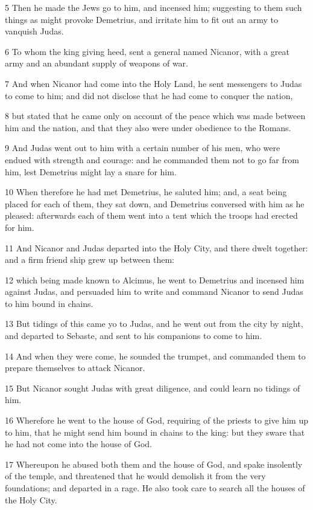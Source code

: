 5 Then he made the Jews go to him, and incensed him; suggesting to them such things as might provoke Demetrius, and irritate him to fit out an army to vanquish Judas. 

6 To whom the king giving heed, sent a general named Nicanor, with a great army and an abundant supply of weapons of war. 

7 And when Nicanor had come into the Holy Land, he sent messengers to Judas to come to him; and did not disclose that he had come to conquer the nation, 

8 but stated that he came only on account of the peace which was made between him and the nation, and that they also were under obedience to the Romans. 

9 And Judas went out to him with a certain number of his men, who were endued with strength and courage: and he commanded them not to go far from him, lest Demetrius might lay a snare for him.

10 When therefore he had met Demetrius, he saluted him; and, a seat being placed for each of them, they sat down, and Demetrius conversed with him as he pleased: afterwards each of them went into a tent which the troops had erected for him. 

11 And Nicanor and Judas departed into the Holy City, and there dwelt together: and a firm friend ship grew up between them: 

12 which being made known to Alcimus, he went to Demetrius and incensed him against Judas, and persuaded him to write and command Nicanor to send Judas to him bound in chains. 

13 But tidings of this came yo to Judas, and he went out from the city by night, and departed to Sebaste, and sent to his companions to come to him. 

14 And when they were come, he sounded the trumpet, and commanded them to prepare themselves to attack Nicanor. 

15 But Nicanor sought Judas with great diligence, and could learn no tidings of him. 

16 Wherefore he went to the house of God, requiring of the priests to give him up to him, that he might send him bound in chains to the king: but they sware that he had not come into the house of God. 

17 Whereupon he abused both them and the house of God, and spake insolently of the temple, and threatened that he would demolish it from the very foundations; and departed in a rage. He also took care to search all the houses of the Holy City. 

